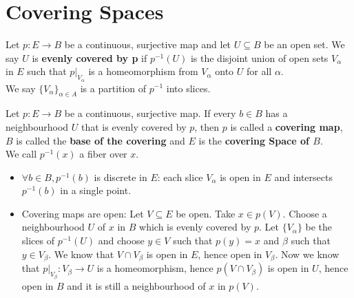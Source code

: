 \section{Covering Spaces}
\begin{definition}\label{3.1}
    Let $p:E\to B$ be a continuous, surjective map and let $U\subseteq B$ be an open set. We say $U$ is \textbf{evenly covered by p} if $p^{-1}(U)$ is the disjoint union of open sets $V_\alpha$ in $E$ such that $p|_{V_\alpha}$ is a homeomorphism from $V_\alpha$ onto $U$ for all $\alpha$.\\
    We say $\{V_\alpha\}_{\alpha\in A}$ is a partition of $p^{-1}$ into slices.
\end{definition}
\begin{definition}\label{3.2}
    Let $p:E\to B$ be a continuous, surjective map. If every $b\in B$ has a neighbourhood $U$ that is evenly covered by $p$, then $p$ is called a \textbf{covering map}, $B$ is called the \textbf{base of the covering} and $E$ is the \textbf{covering Space of $B$}.\\
    We call $p^{-1}(x)$ a fiber over $x$.
\end{definition}
\begin{remark}\label{3.3}
    \leavevmode
    \begin{itemize}
        \item $\forall b\in B,p^{-1}(b)$ is discrete in $E$: each slice $V_\alpha$ is open in $E$ and intersects $p^{-1}(b)$ in a single point.
        \item Covering maps are open: Let $V\subseteq E$ be open. Take $x\in p(V)$. Choose a neighbourhood $U$ of $x$ in $B$ which is evenly covered by $p$. Let $\{V_\alpha\}$ be the slices of $p^{-1}(U)$ and choose $y\in V$ such that $p(y)=x$ and $\beta$ such that $y\in V_\beta$. We know that $V\cap V_\beta$ is open in $E$, hence open in $V_\beta$. Now we know that $p|_{V_\beta}:V_\beta\to U$ is a homeomorphism, hence $p(V\cap V_\beta)$ is open in $U$, hence open in $B$ and it is still a neighbourhood of $x$ in $p(V)$.
    \end{itemize}
\end{remark}
